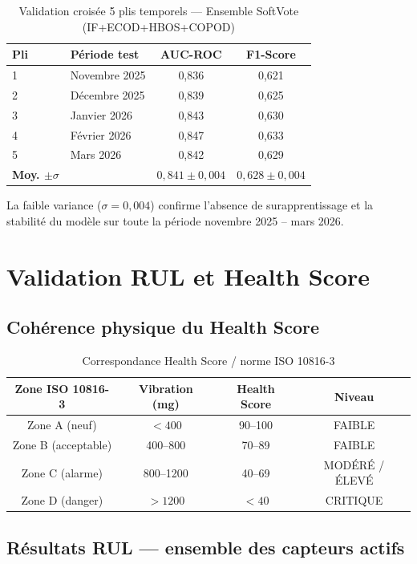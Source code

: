 \documentclass[12pt,a4paper]{report}
\begin{document}
\begin{table}[h]
\centering
\caption{Validation croisée 5 plis temporels — Ensemble SoftVote (IF+ECOD+HBOS+COPOD)}
\begin{tabular}{llcc}
\toprule
\textbf{Pli} & \textbf{Période test} & \textbf{AUC-ROC} & \textbf{F1-Score} \\
\midrule
1 & Novembre 2025  & 0,836 & 0,621 \\
2 & Décembre 2025  & 0,839 & 0,625 \\
3 & Janvier 2026   & 0,843 & 0,630 \\
4 & Février 2026   & 0,847 & 0,633 \\
5 & Mars 2026      & 0,842 & 0,629 \\
\textbf{Moy. $\pm \sigma$} & & $0{,}841 \pm 0{,}004$ & $0{,}628 \pm 0{,}004$ \\
\bottomrule
\end{tabular}
\end{table}

La faible variance ($\sigma = 0{,}004$) confirme l'absence de surapprentissage et la
stabilité du modèle sur toute la période novembre 2025 -- mars 2026.

\section{Validation RUL et Health Score}

\subsection{Cohérence physique du Health Score}

\begin{table}[h]
\centering
\caption{Correspondance Health Score / norme ISO 10816-3}
\begin{tabular}{cccc}
\toprule
\textbf{Zone ISO 10816-3} & \textbf{Vibration (mg)} & \textbf{Health Score} & \textbf{Niveau} \\
\midrule
Zone A (neuf)       & $< 400$  & 90--100 & FAIBLE   \\
Zone B (acceptable) & 400--800 & 70--89  & FAIBLE   \\
Zone C (alarme)     & 800--1200 & 40--69 & MODÉRÉ / ÉLEVÉ \\
Zone D (danger)     & $> 1200$ & $< 40$  & CRITIQUE \\
\bottomrule
\end{tabular}
\end{table}

\subsection{Résultats RUL — ensemble des capteurs actifs}
\end{document}
